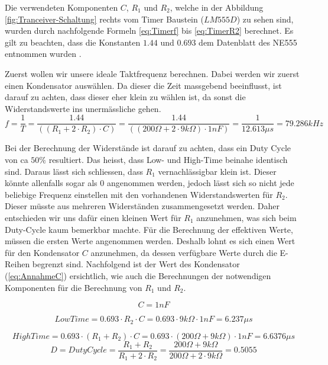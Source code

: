 Die verwendeten Komponenten $C$, $R_{1}$ und $R_{2}$, welche in der Abbildung  \ref{fig:Tranceiver-Schaltung} rechts vom Timer Baustein ($LM555D$) zu sehen sind, wurden durch nachfolgende Formeln \ref{eq:Timerf} bis \ref{eq:TimerR2} berechnet. Es gilt zu beachten, dass die Konstanten $1.44$ und $0.693$ dem Datenblatt des NE555 entnommen wurden \cite{Timerbaustein}.


Zuerst wollen wir unsere ideale Taktfrequenz berechnen. Dabei werden wir zuerst einen Kondensator auswählen. Da dieser die Zeit massgebend beeinflusst, ist darauf zu achten, dass dieser eher klein zu wählen ist, da sonst die Widerstandswerte ins unermässliche gehen.
\begin{equation}\label{eq:Timerf}
f= \dfrac{1}{T}= \dfrac{1.44}{((R_{1} + 2 \cdot R_{2})\cdot C)} = \dfrac{1.44}{((200\Omega + 2 \cdot 9k\Omega)\cdot 1nF)}=\dfrac{1}{12.613\mu s} = 79.286kHz
\end{equation}

Bei der Berechnung der Widerstände ist darauf zu achten, dass ein Duty Cycle von ca $50\%$ resultiert. Das heisst, dass Low- und High-Time beinahe identisch sind. Daraus lässt sich schliessen, dass $R_{1}$ vernachlässigbar klein ist. Dieser könnte allenfalls sogar als $0$ angenommen werden, jedoch lässt sich so nicht jede beliebige Frequenz einstellen mit den vorhandenen Widerstandswerten für $R_{2}$. Dieser müsste aus mehreren Widerständen zusammengesetzt werden. Daher entschieden wir uns dafür einen kleinen Wert für $R_{1}$ anzunehmen, was sich beim Duty-Cycle kaum bemerkbar machte. Für die Berechnung der effektiven Werte, müssen die ersten Werte angenommen werden. Deshalb lohnt es sich einen Wert für den Kondensator $C$ anzunehmen, da dessen verfügbare Werte durch die E-Reihen begrenzt sind. Nachfolgend ist der Wert des Kondensator (\ref{eq:AnnahmeC}) ersichtlich, wie auch die Berechnungen der notwendigen Komponenten für die Berechnung von $R_{1}$ und $R_{2}$.

\begin{equation}\label{eq:AnnahmeC}
C= 1nF
\end{equation}

\begin{equation}\label{eq:TimerT}
LowTime= 0.693 \cdot R_{2} \cdot C = 0.693 \cdot 9k\Omega \cdot 1nF = 6.237\mu s
\end{equation}

\begin{equation}\label{eq:TimerTH}
HighTime= 0.693 \cdot (R_{1} + R_{2}) \cdot C = 0.693 \cdot (200\Omega + 9k\Omega) \cdot 1nF = 6.6376\mu s
\end{equation}
\begin{equation}\label{eq:TimerDC}
D = DutyCycle = \dfrac{R_{1} + R_{2}}{R_{1} + 2 \cdot R_{2}} = \dfrac{200\Omega + 9k\Omega}{200\Omega + 2 \cdot 9k\Omega} = 0.5055
\end{equation}

